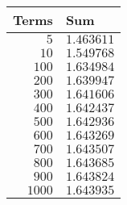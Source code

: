 \begin{tabular}{rl}    \toprule
Terms   & Sum        \\\midrule
$5$     & $1.463611$ \\
$10$    & $1.549768$ \\
$100$   & $1.634984$ \\
$200$   & $1.639947$ \\
$300$   & $1.641606$ \\
$400$   & $1.642437$ \\
$500$   & $1.642936$ \\
$600$   & $1.643269$ \\
$700$   & $1.643507$ \\
$800$   & $1.643685$ \\
$900$   & $1.643824$ \\
$1000$  & $1.643935$ \\\bottomrule
\end{tabular}

